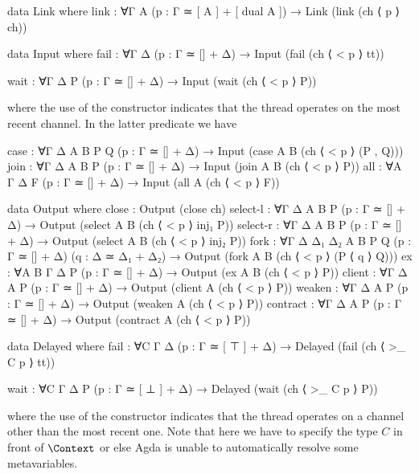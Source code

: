 \begin{AgdaAlign}
\begin{code}[hide]
data Link where
  link : ∀{Γ A} (p : Γ ≃ [ A ] + [ dual A ]) → Link (link (ch ⟨ p ⟩ ch))

data Input where
  fail : ∀{Γ Δ} (p : Γ ≃ [] + Δ) → Input (fail (ch ⟨ < p ⟩ tt))
\end{code}

\begin{code}
  wait : ∀{Γ Δ P} (p : Γ ≃ [] + Δ) → Input (wait (ch ⟨ < p ⟩ P))
\end{code}
where the use of the constructor \AgdaInductiveConstructor{<} indicates that the
thread operates on the most recent channel. In the latter predicate we have

\begin{code}[hide]
  case : ∀{Γ Δ A B P Q} (p : Γ ≃ [] + Δ) → Input (case {A} {B} (ch ⟨ < p ⟩ (P , Q)))
  join : ∀{Γ Δ A B P} (p : Γ ≃ [] + Δ) → Input (join {A} {B} (ch ⟨ < p ⟩ P))
  all  : ∀{A Γ Δ F} (p : Γ ≃ [] + Δ) → Input (all {A} (ch ⟨ < p ⟩ F))

data Output where
  close    : Output (close ch)
  select-l : ∀{Γ Δ A B P} (p : Γ ≃ [] + Δ) → Output (select {A} {B} (ch ⟨ < p ⟩ inj₁ P))
  select-r : ∀{Γ Δ A B P} (p : Γ ≃ [] + Δ) → Output (select {A} {B} (ch ⟨ < p ⟩ inj₂ P))
  fork     : ∀{Γ Δ Δ₁ Δ₂ A B P Q} (p : Γ ≃ [] + Δ) (q : Δ ≃ Δ₁ + Δ₂) → Output (fork {A} {B} (ch ⟨ < p ⟩ (P ⟨ q ⟩ Q)))
  ex       : ∀{A B Γ Δ P} (p : Γ ≃ [] + Δ) → Output (ex {A} {B} (ch ⟨ < p ⟩ P))
  client   : ∀{Γ Δ A P}   (p : Γ ≃ [] + Δ) → Output (client {A} (ch ⟨ < p ⟩ P))
  weaken   : ∀{Γ Δ A P}   (p : Γ ≃ [] + Δ) → Output (weaken {A} (ch ⟨ < p ⟩ P))
  contract : ∀{Γ Δ A P}   (p : Γ ≃ [] + Δ) → Output (contract {A} (ch ⟨ < p ⟩ P))

data Delayed where
  fail     : ∀{C Γ Δ} (p : Γ ≃ [ ⊤ ] + Δ) → Delayed (fail (ch ⟨ >_ {C} p ⟩ tt))
\end{code}

\begin{code}
  wait     : ∀{C Γ Δ P} (p : Γ ≃ [ ⊥ ] + Δ) → Delayed (wait (ch ⟨ >_ {C} p ⟩ P))
\end{code}
where the use of the constructor \AgdaInductiveConstructor{>} indicates that the
thread operates on a channel other than the most recent one. Note that here we
have to specify the type $C$ in front of $\Context$ or else Agda is unable to
automatically resolve some metavariables.


\end{AgdaAlign}
